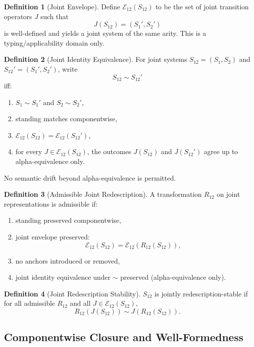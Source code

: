 \documentclass[11pt]{article}
\theoremstyle{definition}
\newtheorem{definition}{Definition}
\begin{document}
\begin{definition}[Joint Envelope]
Define $\mathcal{E}_{12}(S_{12})$ to be the set of joint transition operators $J$ such that
\[
J(S_{12})=(S_1',S_2')
\]
is well-defined and yields a joint system of the same arity. This is a typing/applicability domain only.
\end{definition}

\begin{definition}[Joint Identity Equivalence]
For joint systems $S_{12}=(S_1,S_2)$ and $S_{12}'=(S_1',S_2')$, write
\[
S_{12}\sim S_{12}'
\]
iff:
\begin{enumerate}[label=(\roman*)]
    \item $S_1\sim S_1'$ and $S_2\sim S_2'$,
    \item standing matches componentwise,
    \item $\mathcal{E}_{12}(S_{12})=\mathcal{E}_{12}(S_{12}')$,
    \item for every $J\in\mathcal{E}_{12}(S_{12})$, the outcomes $J(S_{12})$ and $J(S_{12}')$ agree up to alpha-equivalence only.
\end{enumerate}
No semantic drift beyond alpha-equivalence is permitted.
\end{definition}

\begin{definition}[Admissible Joint Redescription]
A transformation $R_{12}$ on joint representations is admissible if:
\begin{enumerate}[label=(\roman*)]
    \item standing preserved componentwise,
    \item joint envelope preserved:
    \[
    \mathcal{E}_{12}(S_{12})=\mathcal{E}_{12}(R_{12}(S_{12})),
    \]
    \item no anchors introduced or removed,
    \item joint identity equivalence under $\sim$ preserved (alpha-equivalence only).
\end{enumerate}
\end{definition}

\begin{definition}[Joint Redescription Stability]
$S_{12}$ is jointly redescription-stable if for all admissible $R_{12}$ and all $J\in\mathcal{E}_{12}(S_{12})$,
\[
R_{12}(J(S_{12}))\sim J(R_{12}(S_{12})).
\]
\end{definition}

\subsection{Componentwise Closure and Well-Formedness}
\end{document}
